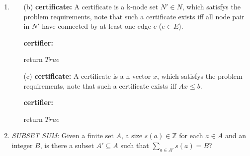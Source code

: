 \documentclass[12pt,a4paper]{article}
\makeatletter
\newtheorem*{solution}{Solution}
\theoremstyle{definition}
\renewenvironment{solution}[1][Solution] {\par\pushQED{\qed}\normalfont\topsep6\p@\@plus6\p@\relax\trivlist\item[\hskip\labelsep\bfseries#1\@addpunct{.}]\ignorespaces}{\popQED\endtrivlist\@endpefalse} \makeatother
\makeatother
\begin{document}
\begin{enumerate}
\begin{solution}
\begin{itemize}
\begin{minipage}[t]{0.8\textwidth}
\begin{algorithm}[H]
        \end{algorithm}
        \end{minipage}
        \hfill
    \item [(b)] \textbf{certificate:} A certificate is a k-node set $N' \in N$, which satisfys the problem requirements, note that such a certificate exists iff all node pair in $N'$ have connected by at least one edge $e$ ($e \in E$).\par
    \textbf{certifier:} \par 
        \begin{minipage}[t]{0.8\textwidth}
        \begin{algorithm}[H]
            \caption{$certifier\ 2$}
            \label{ALG2}
            return $True$\;

        \end{algorithm}
        \end{minipage}
        \hfill
    \item [(c)] \textbf{certificate:} A certificate is a n-vector $x$, which satisfys the problem requirements, note that such a certificate exists iff $Ax \leq b$.\par
    \textbf{certifier:} \par 
        \begin{minipage}[t]{0.8\textwidth}
        \begin{algorithm}[H]
            \caption{$certifier\ 3$}
            \label{ALG3}
            return $True$\;

        \end{algorithm}
        \end{minipage}
        \hfill
    \end{itemize}
    \end{solution}

    \item
    \emph{SUBSET SUM}: Given a finite set $A$, a size $s(a) \in \mathbb{Z}$ for each $a \in A$ and an integer $B$, is there a subset $A' \subseteq A$ such that $\sum_{a \in A'}s(a) = B$?


\end{enumerate}
\end{document}
